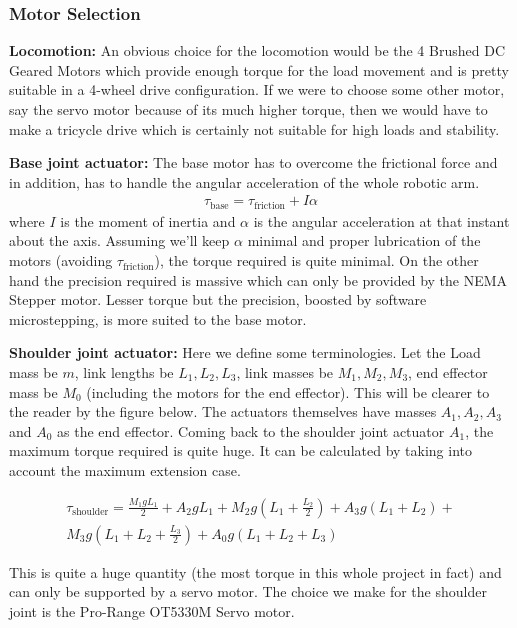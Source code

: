 \documentclass[12pt]{article}
\providecommand{\brak}[1]{\ensuremath{\left(#1\right)}}
\begin{document}
\subsubsection*{Motor Selection}
\textbf{Locomotion:} An obvious choice for the locomotion would be the 4 Brushed DC Geared Motors which provide enough torque for the load movement and is pretty suitable in a 4-wheel drive configuration.
\newline
If we were to choose some other motor, say the servo motor because of its much higher torque, then we would have to make a tricycle drive which is certainly not suitable for high loads and stability.

\textbf{Base joint actuator:} The base motor has to overcome the frictional force and in addition, has to handle the angular acceleration of the whole robotic arm.
\begin{align}
    \tau_{\text{base}} = \tau_{\text{friction}} + I\alpha
\end{align}
where $I$ is the moment of inertia and $\alpha$ is the angular acceleration at that instant about the axis.
\newline
Assuming we'll keep $\alpha$ minimal and proper lubrication of the motors (avoiding $\tau_{\text{friction}}$), the torque required is quite minimal. On the other hand the precision required is massive which can only be provided by the NEMA Stepper motor. Lesser torque but the precision, boosted by software microstepping, is more suited to the base motor.

\textbf{Shoulder joint actuator:} Here we define some terminologies. Let the Load mass be $m$, link lengths be $L_1, L_2, L_3$, link masses be $M_1, M_2, M_3$, end effector mass be $M_0$ (including the motors for the end effector). This will be clearer to the reader by the figure below. The actuators themselves have masses $A_1, A_2, A_3$ and $A_0$ as the end effector.
\newline
Coming back to the shoulder joint actuator $A_1$, the maximum torque required is quite huge. It can be calculated by taking into account the maximum extension case.

\begin{multline*}
    \tau_{\text{shoulder}} = \frac{M_1 g L_1}{2} + A_2 g L_1 + M_2 g \brak{L_1 + \frac{L_2}{2}} + A_3 g \brak{L_1 + L_2} + \\ M_3 g \brak{L_1 + L_2 + \frac{L_3}{2}} + A_0 g \brak{L_1 + L_2 + L_3}
\end{multline*}

This is quite a huge quantity (the most torque in this whole project in fact) and can only be supported by a servo motor. The choice we make for the shoulder joint is the Pro-Range OT5330M Servo motor.
\end{document}
